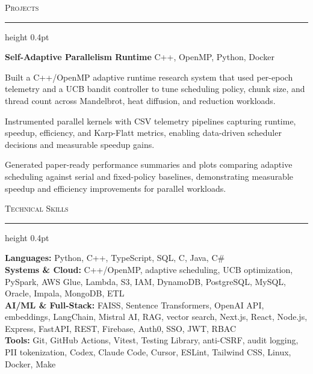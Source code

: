 \documentclass[letterpaper,11pt]{article}
\newcommand{\resumesection}[1]{%
  \par\vspace{2pt}%
  {\large\scshape #1}\par\vspace{2pt}%
  \hrule height 0.4pt\vspace{2pt}%
}
\newcommand{\projectHeading}[2]{
  \textbf{#1} \hfill #2
}
\begin{document}
\resumesection{Projects}
\projectHeading{Self-Adaptive Parallelism Runtime}{C++, OpenMP, Python, Docker}
\begin{tightitemize}
  \item Built a C++/OpenMP adaptive runtime research system that used per-epoch telemetry and a UCB bandit controller to tune scheduling policy, chunk size, and thread count across Mandelbrot, heat diffusion, and reduction workloads.
  \item Instrumented parallel kernels with CSV telemetry pipelines capturing runtime, speedup, efficiency, and Karp-Flatt metrics, enabling data-driven scheduler decisions and measurable speedup gains.
  \item Generated paper-ready performance summaries and plots comparing adaptive scheduling against serial and fixed-policy baselines, demonstrating measurable speedup and efficiency improvements for parallel workloads.
\end{tightitemize}

\resumesection{Technical Skills}
\textbf{Languages:} Python, C++, TypeScript, SQL, C, Java, C\#\\
\textbf{Systems \& Cloud:} C++/OpenMP, adaptive scheduling, UCB optimization, PySpark, AWS Glue, Lambda, S3, IAM, DynamoDB, PostgreSQL, MySQL, Oracle, Impala, MongoDB, ETL\\
\textbf{AI/ML \& Full-Stack:} FAISS, Sentence Transformers, OpenAI API, embeddings, LangChain, Mistral AI, RAG, vector search, Next.js, React, Node.js, Express, FastAPI, REST, Firebase, Auth0, SSO, JWT, RBAC\\
\textbf{Tools:} Git, GitHub Actions, Vitest, Testing Library, anti-CSRF, audit logging, PII tokenization, Codex, Claude Code, Cursor, ESLint, Tailwind CSS, Linux, Docker, Make
\end{document}
